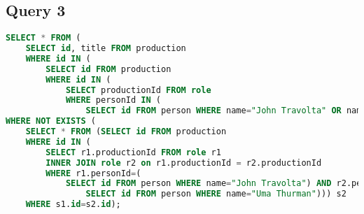 \subsection{Query 3}
\begin{lstlisting}[language=sql]
SELECT * FROM (
	SELECT id, title FROM production
	WHERE id IN (
		SELECT id FROM production
		WHERE id IN (
			SELECT productionId FROM role
			WHERE personId IN (
				SELECT id FROM person WHERE name="John Travolta" OR name="Uma Thurman")))) s1
WHERE NOT EXISTS (
	SELECT * FROM (SELECT id FROM production 
	WHERE id IN (
		SELECT r1.productionId FROM role r1
		INNER JOIN role r2 on r1.productionId = r2.productionId 
		WHERE r1.personId=(
			SELECT id FROM person WHERE name="John Travolta") AND r2.personId=(
				SELECT id FROM person WHERE name="Uma Thurman"))) s2 
	WHERE s1.id=s2.id);
\end{lstlisting}

